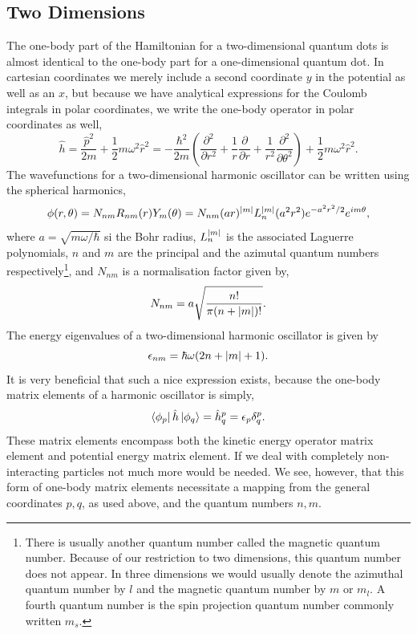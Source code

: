 \subsection{Two Dimensions}

The one-body part of the Hamiltonian for a two-dimensional quantum dots is almost
identical to the one-body part for a one-dimensional quantum dot. In cartesian
coordinates we merely include a second coordinate $y$ in the potential as well as
an $x$, but 
because we have analytical expressions for the Coulomb integrals in polar
coordinates\cite{anisimovas1998energy}, we write the one-body operator in 
polar coordinates as well,
\begin{equation}
    \label{eq:2d_ho_one_body_hamiltonian}
    \hat{h} = \frac{\hat{p}^2}{2m} + \frac{1}{2}m\omega^2\hat{r}^2
        = - \frac{\hbar^2}{2m}\left(
            \frac{\partial^2}{\partial r^2}
            + \frac{1}{r} \frac{\partial}{\partial r}
            + \frac{1}{r^2} \frac{\partial^2}{\partial \theta^2}
        \right)
        + \frac{1}{2}m\omega^2\hat{r}^2.
\end{equation}
The wavefunctions for a two-dimensional harmonic oscillator can be
written using the spherical harmonics,
\begin{equation}
    \label{eq:2d_ho_eigenstate}
    \phi(r,\theta) = N_{nm} R_{nm}(r) Y_m(\theta) = N_{nm} (ar)^{\abs{m}} L_n^{\abs{m}}(a^2r^2)
        e^{-a^2r^2/2} e^{im\theta},
\end{equation}
where $a=\sqrt{m\omega/\hbar}$ si the Bohr radius, $L^{\abs{m}}_n$ is 
the associated Laguerre polynomials, $n$ and $m$ are the principal and
the azimutal quantum numbers respectively\footnote{There is usually another quantum 
number called the magnetic quantum number. Because of our restriction to two dimensions,
this quantum number does not appear. In three dimensions we would usually denote the azimuthal
quantum number by $l$ and the magnetic quantum number by $m$ or $m_l$. A fourth quantum 
number is the spin projection quantum number commonly written $m_s$.}, and $N_{nm}$ is a normalisation 
factor given by,
\begin{equation}
    N_{nm} = a\sqrt{\frac{n!}{\pi(n + \abs{m})!}}.
\end{equation}
The energy eigenvalues of a two-dimensional harmonic oscillator is given by 
\begin{equation}
    \epsilon_{nm} = \hbar\omega(2n + \abs{m} + 1).
\end{equation}
It is very beneficial that such a nice expression exists, because the one-body 
matrix elements of a harmonic oscillator is simply,
\begin{equation}
    \bra{\phi_p}\hat{h}\ket{\phi_q} = \hat{h}^p_q = \epsilon_p \delta^p_q.
\end{equation}
These matrix elements encompass both the kinetic energy operator matrix element and 
potential energy matrix element. If we deal with completely non-interacting 
particles not much more would be needed.
We see, however, that this form of one-body matrix elements necessitate a mapping from 
the general coordinates $p,q$, as used above, and the quantum numbers $n,m$.

